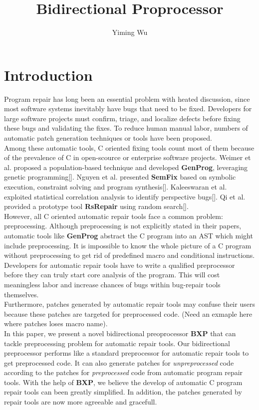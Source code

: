 \documentclass[11pt]{article}
\title{Bidirectional Proprocessor}
\author{Yiming Wu}
\theoremstyle{theorem}
\theoremstyle{lemma}
\theoremstyle{property}
\theoremstyle{definition}
\theoremstyle{assumption}
\begin{document}
\maketitle

\section{Introduction}

Program repair has long been an essential problem with heated discussion, since most software systems inevitably have bugs that need to be fixed. Developers for large software projects must confirm, triage, and localize defects before fixing these bugs and validating the fixes. To reduce human manual labor, numbers of automatic patch generation techniques or tools have been proposed.\\

Among these automatic tools, C oriented fixing tools count most of them because of the prevalence of C in open-scource or enterprise software projects. 
Weimer et al. proposed a population-based technique and developed \textbf{GenProg}, leveraging genetic programming[].
Nguyen et al. presented \textbf{SemFix} based on symbolic execution, constraint solving and program synthesis[].
Kaleeswaran et al. exploited statistical correlation analysis to identify perspective bugs[].
Qi et al. provided a prototype tool \textbf{RsRepair} using random search[].
\\

However, all C oriented automatic repair tools face a common problem: preprocessing. 
Although preprocessing is not explicitly stated in their papers, automatic tools like \textbf{GenProg} abstract the C program into an AST which might include preprocessing.
It is impossible to know the whole picture of a C program without preprocessing to get rid of predefined macro and conditional instructions.
Developers for automatic repair tools have to write a qualified preprocessor before they can truly start core analysis of the program.
This will cost meaningless labor and increase chances of bugs within bug-repair tools themselves.
\\

Furthermore, patches generated by automatic repair tools may confuse their users because these patches are targeted for preprocessed code.
(Need an exmaple here where patches loses macro name).
\\

In this paper, we present a novel bidirectional preoprocessor \textbf{BXP} that can tackle preprocessing problem for automatic repair tools. 
Our bidirectional preprocessor performs like a standard preprocessor for automatic repair tools to get preprocessed code.
It can also generate patches for \textsl{unpreprocessed} code according to the patches for \textsl{preprocessed} code from automatic program repair tools.
With the help of \textbf{BXP}, we believe the develop of automatic C program repair tools can been greatly simplified.
In addition, the patches generated by repair tools are now more agreeable and gracefull.
\\
\end{document}
